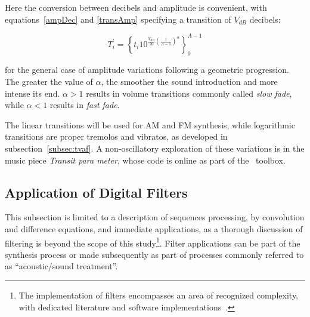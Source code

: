 Here the conversion between decibels and amplitude is convenient, with equations~\ref{ampDec} and \ref{transAmp} specifying a transition of $V_{dB}$ decibels:

\begin{equation}\label{seqAmpDB}
T_i^{'}=\left\{ t_i 10^{\frac{V_{dB}}{20}\left( \frac{i}{\Lambda-1} \right)^\alpha} \right\}_0^{\Lambda-1}
\end{equation}

\noindent for the general case of amplitude variations following a geometric progression. The greater the value of $\alpha$, the smoother the sound introduction and more intense its end. $\alpha>1$ results in volume transitions commonly called \emph{slow fade}, while $\alpha<1$ results in \emph{fast fade}\cite{guillaume}.

The linear transitions will be used for AM and FM synthesis, while logarithmic transitions are proper tremolos and vibratos, as developed in subsection~\ref{subsec:tvaf}. A non-oscillatory exploration of these variations is in the music piece \emph{Transit para meter}, whose code is online as part of the \massa\ toolbox\cite{MASSA}.

\subsection{Application of Digital Filters}\label{subsec:filtros}
This subsection is limited to a description of sequences processing, by convolution and difference equations, and immediate applications, as a thorough discussion of filtering is beyond the scope of this study\footnote{The implementation of filters encompasses an area of recognized complexity, with dedicated literature and software implementations~\cite{Openheim,smith}.}. Filter applications can be part of the synthesis process or made subsequently as part of processes commonly referred to as ``acoustic/sound treatment''.

